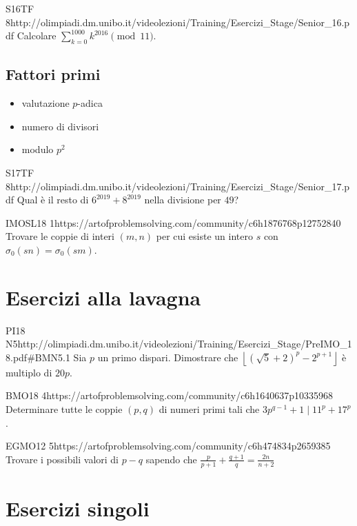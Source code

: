 \documentclass[12pt]{article}
\begin{document}
\begin{esercizio}{S16TF 8}{http://olimpiadi.dm.unibo.it/videolezioni/Training/Esercizi_Stage/Senior_16.pdf}
    Calcolare $\sum_{k=0}^{1000} k^{2016}\pmod{11}$.
\end{esercizio}


\subsection{Fattori primi}

\begin{itemize}
    \item valutazione $p$-adica
    \item numero di divisori
    \item modulo $p^2$
\end{itemize}

\begin{esercizio}{S17TF 8}{http://olimpiadi.dm.unibo.it/videolezioni/Training/Esercizi_Stage/Senior_17.pdf}
    Qual è il resto di $6^{2019}+8^{2019}$ nella divisione per $49$?
\end{esercizio}

\begin{esercizio}{IMOSL18 1}{https://artofproblemsolving.com/community/c6h1876768p12752840}
    Trovare le coppie di interi $(m,n)$ per cui esiste un intero $s$ con $\sigma_0(sn)=\sigma_0(sm)$.
\end{esercizio}


\section{Esercizi alla lavagna}

\begin{esercizio}{PI18 N5}{http://olimpiadi.dm.unibo.it/videolezioni/Training/Esercizi_Stage/PreIMO_18.pdf\#BMN5.1}
    Sia $p$ un primo dispari. Dimostrare che $\left\lfloor (\sqrt5+2)^p-2^{p+1} \right\rfloor$ è multiplo di $20p$.
\end{esercizio}

\begin{esercizio}{BMO18 4}{https://artofproblemsolving.com/community/c6h1640637p10335968}
    Determinare tutte le coppie $(p,q)$ di numeri primi tali che $3p^{q-1}+1\mid11^p+17^p$.
\end{esercizio}

\begin{esercizio}{EGMO12 5}{https://artofproblemsolving.com/community/c6h474834p2659385}
    Trovare i possibili valori di $p-q$ sapendo che $\frac{p}{p+1}+\frac{q+1}{q}=\frac{2n}{n+2}$
\end{esercizio}

\section{Esercizi singoli}
\end{document}
